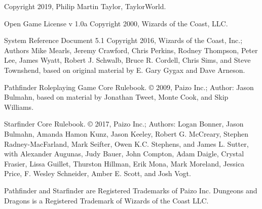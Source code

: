 \documentclass[12pt]{extreport}
\begin{document}
\begin{center}
  Copyright 2019, Philip Martin Taylor, TaylorWorld.
\end{center}
\begin{center}
  Open Game License v 1.0a Copyright 2000, Wizards of the Coast, LLC.
\end{center}
\begin{center}
  System Reference Document 5.1 Copyright 2016, Wizards of the Coast, Inc.; Authors Mike Mearls, Jeremy Crawford, Chris Perkins, Rodney Thompson, Peter Lee, James Wyatt, Robert J. Schwalb, Bruce R. Cordell, Chris Sims, and Steve Townshend, based on original material by E. Gary Gygax and Dave Arneson.
\end{center}
\begin{center}
  Pathfinder Roleplaying Game Core Rulebook. © 2009, Paizo Inc.; Author: Jason Bulmahn, based on material by Jonathan Tweet, Monte Cook, and Skip Williams.
\end{center}
\begin{center}
  Starfinder Core Rulebook. © 2017, Paizo Inc.; Authors: Logan Bonner, Jason Bulmahn, Amanda Hamon Kunz, Jason Keeley, Robert G. McCreary, Stephen Radney-MacFarland, Mark Seifter, Owen K.C. Stephens, and James L. Sutter, with Alexander Augunas, Judy Bauer, John Compton, Adam Daigle, Crystal Frasier, Lissa Guillet, Thurston Hillman, Erik Mona, Mark Moreland, Jessica Price, F. Wesley Schneider, Amber E. Scott, and Josh Vogt.
\end{center}
\begin{center}
  Pathfinder and Starfinder are Registered Trademarks of Paizo Inc. Dungeons and Dragons is a Registered Trademark of Wizards of 
the Coast LLC. 
\end{center}
\end{document}
